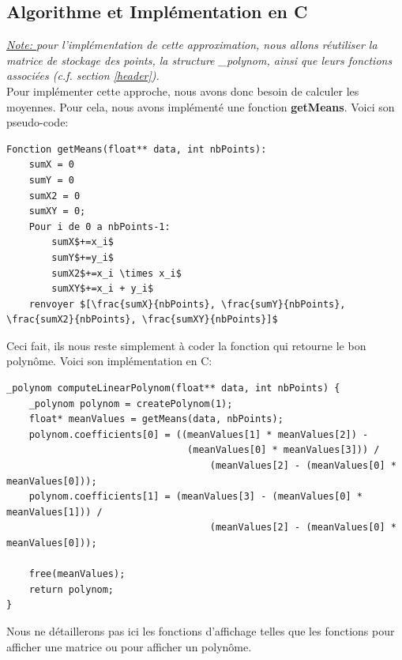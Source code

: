 \subsection{Algorithme et Implémentation en C}
\textit{\underline{Note: } pour l'implémentation de cette approximation, nous allons réutiliser la matrice de stockage des points, la structure \_polynom, ainsi que leurs fonctions associées (c.f. section \ref{header}).}\vspace{5pt}\\
Pour implémenter cette approche, nous avons donc besoin de calculer les moyennes. Pour cela, nous avons implémenté une fonction \textbf{getMeans}. Voici son pseudo-code:\\
\begin{lstlisting}[mathescape=true, basicstyle=\fontsize{8}{10}\selectfont, frame=single]
Fonction getMeans(float** data, int nbPoints):
    sumX = 0
    sumY = 0
    sumX2 = 0
    sumXY = 0;
    Pour i de 0 a nbPoints-1:
        sumX$+=x_i$
        sumY$+=y_i$
        sumX2$+=x_i \times x_i$
        sumXY$+=x_i + y_i$
    renvoyer $[\frac{sumX}{nbPoints}, \frac{sumY}{nbPoints}, \frac{sumX2}{nbPoints}, \frac{sumXY}{nbPoints}]$
\end{lstlisting}
Ceci fait, ils nous reste simplement à coder la fonction qui retourne le bon polynôme. Voici son implémentation en C:\\
\begin{lstlisting}[mathescape=true, basicstyle=\fontsize{8}{10}\selectfont, frame=single]
_polynom computeLinearPolynom(float** data, int nbPoints) {
    _polynom polynom = createPolynom(1);
    float* meanValues = getMeans(data, nbPoints);
    polynom.coefficients[0] = ((meanValues[1] * meanValues[2]) - 
                                (meanValues[0] * meanValues[3])) /
                                    (meanValues[2] - (meanValues[0] * meanValues[0]));
    polynom.coefficients[1] = (meanValues[3] - (meanValues[0] * meanValues[1])) /
                                    (meanValues[2] - (meanValues[0] * meanValues[0]));
    
    free(meanValues);
    return polynom;
}
\end{lstlisting}
Nous ne détaillerons pas ici les fonctions d'affichage telles que les fonctions pour afficher une matrice ou pour afficher un polynôme.
\newpage

